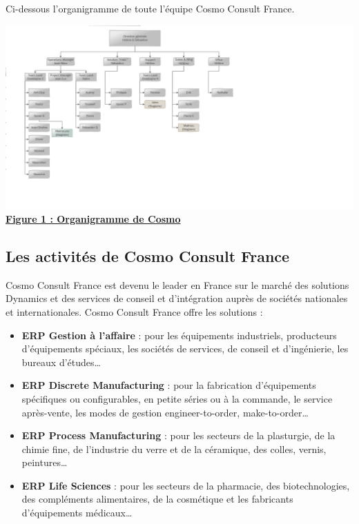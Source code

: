 \documentclass[11pt]{report}
\begin{document}
Ci-dessous l'organigramme de toute l'équipe Cosmo Consult France.
\begin{center}
\includegraphics[scale=0.5]{images/figure1.png}
\underline{\textbf{Figure 1 : Organigramme de Cosmo}}
\end{center}

	\subsection{Les activités de Cosmo Consult France}
\hspace{1cm} Cosmo Consult France est devenu le leader en France sur le marché des solutions Dynamics et des services de conseil et d'intégration auprès de sociétés nationales et internationales. Cosmo Consult France offre les solutions : 
\begin{itemize}
	\item\textbf{ ERP Gestion à l'affaire} : pour les équipements industriels, producteurs d'équipements spéciaux, les sociétés de services, de conseil et d'ingénierie, les bureaux d'études…
	
	\item \textbf{ERP Discrete Manufacturing} : pour la fabrication d'équipements spécifiques ou configurables, en petite séries ou à la commande, le service après-vente, les modes de gestion engineer-to-order, make-to-order…
	
	\item \textbf{ERP Process Manufacturing} : pour les secteurs de la plasturgie, de la chimie fine, de l'industrie du verre et de la céramique, des colles, vernis, peintures…
	
	\item \textbf{ERP Life Sciences} : pour les secteurs de la pharmacie, des biotechnologies, des compléments alimentaires, de la cosmétique et les fabricants d'équipements médicaux…
\end{itemize}
\end{document}
